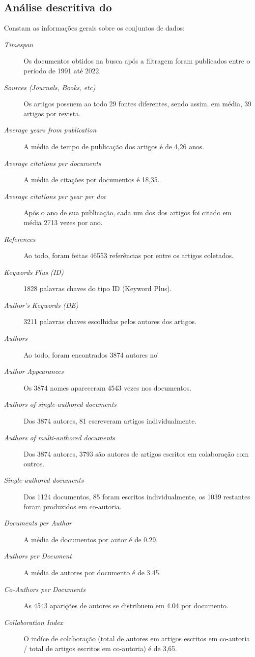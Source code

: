 \subsection{Análise descritiva do \dataset\   }

Constam as informações gerais sobre os conjuntos de dados:
\begin{description}
    \item [\textit{Timespan}] Os documentos obtidos na busca após a filtragem foram publicados entre o período de 1991 até 2022.
    \item [\textit{Sources (Journals, Books, etc)}] Os artigos possuem ao todo 29 fontes diferentes, sendo assim, em média, 39 artigos por revista.
    \item [\textit{Average years from publication}] A média de tempo de publicação dos artigos é de 4,26 anos.
    \item [\textit{Average citations per documents}] A média de citações por documentos é 18,35.
    \item [\textit{Average citations per year per doc}] Após o ano de sua publicação, cada um dos dos artigos foi citado em média 2713 vezes por ano.
    \item [\textit{References}] Ao todo, foram feitas 46553  referências por entre os artigos coletados.
    \item [\textit{Keywords Plus (ID)}] 1828 palavras chaves do tipo ID (Keyword Plus).
    \item [\textit{Author's Keywords (DE)}]  3211 palavras chaves escolhidas pelos autores dos artigos.

    \item [\textit{Authors}]  Ao todo, foram encontrados 3874 autores no \dataset\.
    \item [\textit{Author Appearances}]  Os 3874 nomes apareceram 4543 vezes nos documentos.
    \item [\textit{Authors of single-authored documents}] Dos 3874 autores, 81 escreveram artigos individualmente.
    \item [\textit{Authors of multi-authored documents}] Dos 3874 autores, 3793 são autores de artigos escritos em colaboração com outros.
    \item [\textit{Single-authored documents}] Dos 1124 documentos, 85 foram escritos individualmente, os 1039 restantes foram produzidos em co-autoria.
    \item [\textit{Documents per Author}] A média de documentos por autor é de 0.29.
    \item [\textit{Authors per Document}] A média de autores por documento é de 3.45.
    \item [\textit{Co-Authors per Documents}] As 4543 aparições de autores se distribuem em 4.04 por documento.
    \item [\textit{Collaboration Index}] O indíce de colaboração (total de autores em artigos escritos em co-autoria / total de artigos escritos em co-autoria) é de 3,65.
\end{description}

